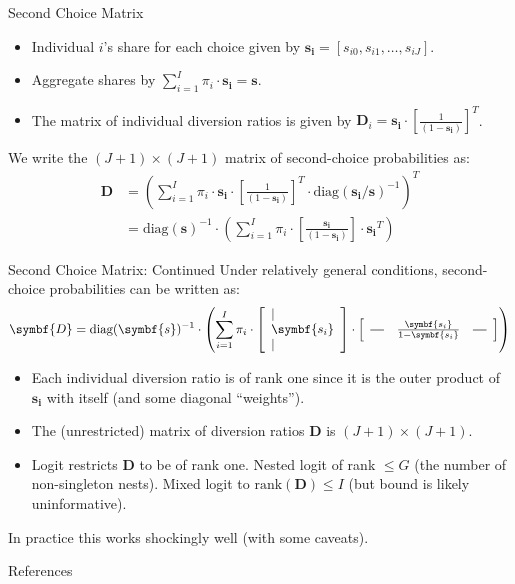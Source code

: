 \documentclass[aspectratio=169,10pt]{beamer}
\newcommand*{\horzbar}{\rule[.5ex]{2.5ex}{0.5pt}}
\begin{document}
\begin{frame}{Second Choice Matrix}
\begin{itemize}
\item Individual $i$'s share for each choice given by $\symbf{s_i} = [s_{i0},s_{i1},\ldots,s_{iJ}]$.
\item Aggregate shares by $\sum_{i=1}^I  \pi_i \cdot \symbf{s_i} =\symbf{s}$.
\item The matrix of individual diversion ratios is given by
$\symbf{D}_i  = \symbf{s_i}  \cdot \left[\frac{1}{(1-\symbf{s_i})} \right]^T$. 
\end{itemize}
We write the $(J+1)\times (J+1)$ matrix of second-choice probabilities as:
\begin{align*}
\nonumber \symbf{D} &=  \left(\sum_{i=1}^I \pi_i \cdot \symbf{s_i} \cdot \left[\frac{1}{(1-\symbf{s_i})} \right]^T \cdot \text{diag}(\symbf{s_i}/\symbf{s})^{-1}\right)^T \\
&=\text{diag}(\symbf{s})^{-1}  \cdot \left(\sum_{i=1}^I \pi_i \cdot  \left[\frac{\symbf{s_i}}{(1-\symbf{s_i})} \right]\cdot  \symbf{s_i}^T   \right) 
\end{align*}
\end{frame}

\begin{frame}{Second Choice Matrix: Continued}
Under relatively general conditions, second-choice probabilities can be written as:
\begin{align*}
\symbf{D}= \text{diag}(\symbf{s})^{-1}  \cdot  \left(\sum_{i=1}^I \pi_i\cdot 
\left[
\begin{array}{l}
\mid \\
\symbf{s_i} \\
\mid
\end{array}\right] \cdot \left[\begin{array}{lll}
\horzbar  &\frac{\symbf{s_i}}{1-\symbf{s_i}}  & \horzbar
\end{array}\right] \right)
\end{align*}
\begin{itemize}
    \item Each individual diversion ratio is of rank one since it is the outer product of $\symbf{s_i}$ with itself (and some diagonal ``weights'').
    \item The (unrestricted) matrix of diversion ratios $\symbf{D}$ is $(J+1)\times(J+1)$.
    \item Logit restricts $\symbf{D}$ to be of rank one. Nested logit of rank $\leq G$ (the number of non-singleton nests). Mixed logit to $\text{rank}(\symbf{D})\leq I$ (but bound is likely uninformative).
\end{itemize}
In practice this works shockingly well (with some caveats).
\end{frame}







\appendix

\begin{frame}{References}
    
\end{frame}
\end{document}

